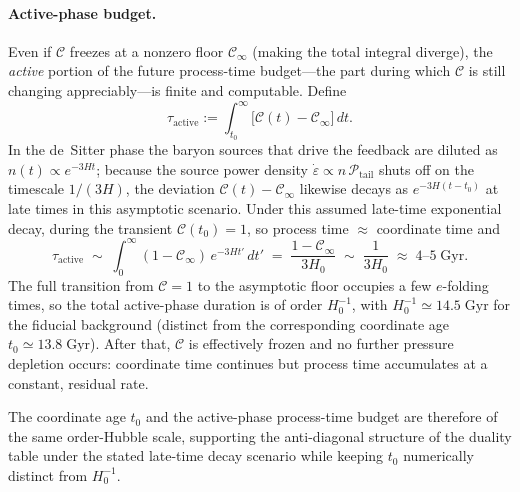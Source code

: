 \documentclass[11pt]{article}
\begin{document}
\paragraph{Active-phase budget.}
Even if $\mathcal{C}$ freezes at a nonzero floor $\mathcal{C}_\infty$
(making the total integral diverge), the \emph{active} portion of
the future process-time budget---the part during which $\mathcal{C}$
is still changing appreciably---is finite and computable.
Define
\begin{equation}\label{eq:tau_active_def}
  \tau_{\mathrm{active}}
  := \int_{t_0}^{\infty}
     \bigl[\mathcal{C}(t)-\mathcal{C}_\infty\bigr]\,dt.
\end{equation}
In the de~Sitter phase the baryon sources that drive the feedback
are diluted as $n(t)\propto e^{-3H t}$; because the source power density
$\dot\varepsilon\propto n\,\mathcal{P}_{\mathrm{tail}}$ shuts off
on the timescale $1/(3H)$, the deviation
$\mathcal{C}(t)-\mathcal{C}_\infty$ likewise decays as
$e^{-3H(t-t_0)}$ at late times in this asymptotic scenario.  Under
this assumed late-time exponential decay, during the transient
$\mathcal{C}(t_0)=1$, so process time $\approx$ coordinate time and
\begin{equation}\label{eq:tau_active}
  \tau_{\mathrm{active}}
  \;\sim\; \int_{0}^{\infty}
           (1-\mathcal{C}_\infty)\,e^{-3Ht'}\,dt'
  \;=\; \frac{1-\mathcal{C}_\infty}{3H_0}
  \;\sim\; \frac{1}{3H_0}
  \;\approx\; 4\text{--}5\;\mathrm{Gyr}.
\end{equation}
The full transition from $\mathcal{C}=1$ to the asymptotic floor
occupies a few $e$-folding times, so the total active-phase
duration is of order $H_0^{-1}$, with $H_0^{-1}\simeq
14.5\;\mathrm{Gyr}$ for the fiducial background (distinct from the
corresponding coordinate age $t_0\simeq 13.8\;\mathrm{Gyr}$).
After that, $\mathcal{C}$ is effectively frozen and no further
pressure depletion occurs: coordinate time continues but process
time accumulates at a constant, residual rate.

The coordinate age $t_0$ and the active-phase process-time budget
are therefore of the same order-Hubble scale, supporting the
anti-diagonal structure of the duality table under the stated
late-time decay scenario while keeping $t_0$ numerically distinct
from $H_0^{-1}$.
\end{document}
